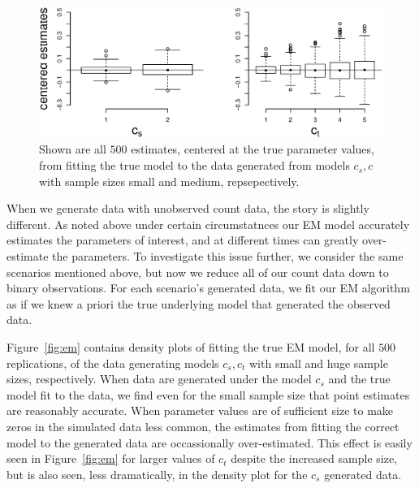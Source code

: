 \begin{figure}
  \centering
  \includegraphics[scale=0.5]{bp}
  \caption{Shown are all $500$ estimates, centered at the true parameter values, from fitting the true model to the data generated from models $c_s,c$ with sample sizes small and medium, repsepectively.}
  \label{fig:bp}
\end{figure}

When we generate data with unobserved count data, the story is slightly different.  As noted above under certain circumstatnces our EM model accurately estimates the parameters of interest, and at different times can greatly over-estimate the parameters.  To investigate this issue further, we consider the same scenarios mentioned above, but now we reduce all of our count data down to binary observations.  For each scenario's generated data, we fit our EM algorithm as if we knew a priori the true underlying model that generated the observed data.  

Figure~\ref{fig:em} contains density plots of fitting the true EM model, for all $500$ replications, of the data generating models $c_s,c_t$ with small and huge sample sizes, respectively.  When data are generated under the model $c_s$ and the true model fit to the data, we find even for the small sample size that point estimates are reasonably accurate.  When parameter values are of sufficient size to make zeros in the simulated data less common, the estimates from fitting the correct model to the generated data are occassionally over-estimated.  This effect is easily seen in Figure~\ref{fig:em} for larger values of $c_t$ despite the increased sample size, but is also seen, less dramatically, in the density plot for the $c_s$ generated data.  



